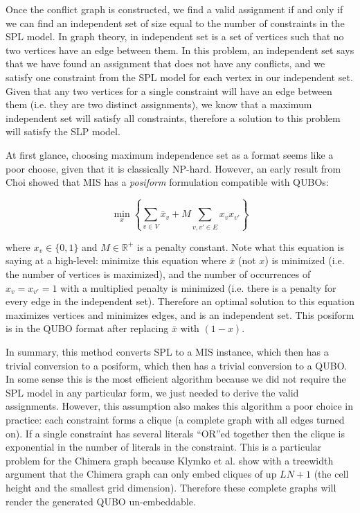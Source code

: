 \documentclass{sig-alternate-05-2015}
\begin{document}
Once the conflict graph is constructed, we find a valid assignment if and only if we can find an independent set of size equal to the number of constraints in the SPL model. In graph theory, in independent set is a set of vertices such that no two vertices have an edge between them. In this problem, an independent set says that we have found an assignment that does not have any conflicts, and we satisfy one constraint from the SPL model for each vertex in our independent set. Given that any two vertices for a single constraint will have an edge between them (i.e. they are two distinct assignments), we know that a maximum independent set will satisfy all constraints, therefore a solution to this problem will satisfy the SLP model.


At first glance, choosing maximum independence set as a format seems like a poor choose, given that it is classically NP-hard. However, an early result from Choi \cite{choi2011minor} showed that MIS has a \emph{posiform} formulation compatible with QUBOs:

\begin{equation}
\min_{x} \left\{ \sum_{v \in V} \bar{x}_v + M \sum_{v,v' \in E} x_v x_{v'} \right\}
\end{equation}

where $x_v \in \{0, 1\}$ and $M \in \mathbb{R}^+$ is a penalty constant. Note what this equation is saying at a high-level: minimize this equation where $\bar{x}$ (not $x$) is minimized (i.e. the number of vertices is maximized), and the number of occurrences of $x_v = x_{v'} = 1$ with a multiplied penalty is minimized (i.e. there is a penalty for every edge in the independent set). Therefore an optimal solution to this equation maximizes vertices and minimizes edges, and is an independent set. This posiform is in the QUBO format after replacing $\bar{x}$ with $(1-x)$.

In summary, this method converts SPL to a MIS instance, which then has a trivial conversion to a posiform, which then has a trivial conversion to a QUBO. In some sense this is the most efficient algorithm because we did not require the SPL model in any particular form, we just needed to derive the valid assignments. However, this assumption also makes this algorithm a poor choice in practice: each constraint forms a clique (a complete graph with all edges turned on). If a single constraint has several literals ``OR''ed together then the clique is exponential in the number of literals in the constraint. This is a particular problem for the Chimera graph because Klymko et al. \cite{klymko2014adiabatic} show with a treewidth argument that the Chimera graph can only embed cliques of up $LN+1$ (the cell height and the smallest grid dimension). Therefore these complete graphs will render the generated QUBO un-embeddable.
\end{document}
